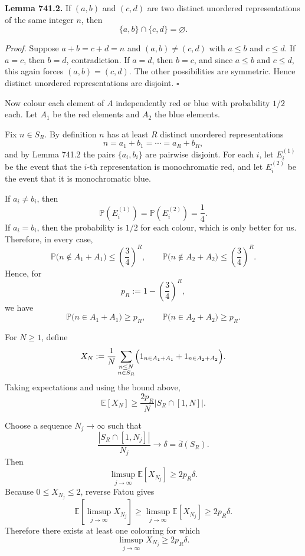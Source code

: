 \medskip
\noindent
\textbf{Lemma 741.2.}
If $(a,b)$ and $(c,d)$ are two distinct unordered representations of the same integer $n$, then
\[
\{a,b\}\cap\{c,d\}=\varnothing.
\]

\medskip
\noindent
\emph{Proof.}
Suppose $a+b=c+d=n$ and $(a,b)\neq(c,d)$ with $a\le b$ and $c\le d$.
If $a=c$, then $b=d$, contradiction.
If $a=d$, then $b=c$, and since $a\le b$ and $c\le d$, this again forces $(a,b)=(c,d)$.
The other possibilities are symmetric.
Hence distinct unordered representations are disjoint. \hfill $\square$

\medskip
Now colour each element of $A$ independently red or blue with probability $1/2$ each.
Let $A_1$ be the red elements and $A_2$ the blue elements.

Fix $n\in S_R$. By definition $n$ has at least $R$ distinct unordered representations
\[
n=a_1+b_1=\cdots=a_R+b_R,
\]
and by Lemma 741.2 the pairs $\{a_i,b_i\}$ are pairwise disjoint.
For each $i$, let $E_i^{(1)}$ be the event that the $i$-th representation is monochromatic red, and let $E_i^{(2)}$ be the event that it is monochromatic blue.

If $a_i\neq b_i$, then
\[
\mathbb P(E_i^{(1)})=\mathbb P(E_i^{(2)})=\frac14.
\]
If $a_i=b_i$, then the probability is $1/2$ for each colour, which is only better for us.
Therefore, in every case,
\[
\mathbb P\bigl(n\notin A_1+A_1\bigr)\le \left(\frac34\right)^R,
\qquad
\mathbb P\bigl(n\notin A_2+A_2\bigr)\le \left(\frac34\right)^R.
\]
Hence, for
\[
p_R:=1-\left(\frac34\right)^R,
\]
we have
\[
\mathbb P\bigl(n\in A_1+A_1\bigr)\ge p_R,
\qquad
\mathbb P\bigl(n\in A_2+A_2\bigr)\ge p_R.
\]

For $N\ge 1$, define
\[
X_N:=\frac1N\sum_{\substack{n\le N\\ n\in S_R}}
\Bigl(1_{n\in A_1+A_1}+1_{n\in A_2+A_2}\Bigr).
\]
Taking expectations and using the bound above,
\[
\mathbb E[X_N]\ge \frac{2p_R}{N}|S_R\cap[1,N]|.
\]

Choose a sequence $N_j\to\infty$ such that
\[
\frac{|S_R\cap[1,N_j]|}{N_j}\to \delta=\overline d(S_R).
\]
Then
\[
\limsup_{j\to\infty}\mathbb E[X_{N_j}]\ge 2p_R\delta.
\]
Because $0\le X_{N_j}\le 2$, reverse Fatou gives
\[
\mathbb E\!\left[\limsup_{j\to\infty}X_{N_j}\right]
\ge
\limsup_{j\to\infty}\mathbb E[X_{N_j}]
\ge 2p_R\delta.
\]
Therefore there exists at least one colouring for which
\[
\limsup_{j\to\infty}X_{N_j}\ge 2p_R\delta.
\]

